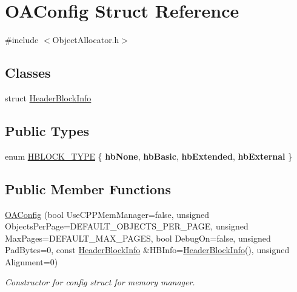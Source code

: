 \hypertarget{structOAConfig}{\section{O\-A\-Config Struct Reference}
\label{structOAConfig}
}


{\ttfamily \#include $<$Object\-Allocator.\-h$>$}

\subsection*{Classes}
\begin{DoxyCompactItemize}
\item 
struct \hyperlink{structOAConfig_1_1HeaderBlockInfo}{Header\-Block\-Info}
\end{DoxyCompactItemize}
\subsection*{Public Types}
\begin{DoxyCompactItemize}
\item 
enum \hyperlink{structOAConfig_a741c6dd161c0174180cc17f9a697b123}{H\-B\-L\-O\-C\-K\-\_\-\-T\-Y\-P\-E} \{ {\bfseries hb\-None}, 
{\bfseries hb\-Basic}, 
{\bfseries hb\-Extended}, 
{\bfseries hb\-External}
 \}
\end{DoxyCompactItemize}
\subsection*{Public Member Functions}
\begin{DoxyCompactItemize}
\item 
\hyperlink{structOAConfig_a036df6b3c5cefef38274637926155397}{O\-A\-Config} (bool Use\-C\-P\-P\-Mem\-Manager=false, unsigned Objects\-Per\-Page=D\-E\-F\-A\-U\-L\-T\-\_\-\-O\-B\-J\-E\-C\-T\-S\-\_\-\-P\-E\-R\-\_\-\-P\-A\-G\-E, unsigned Max\-Pages=D\-E\-F\-A\-U\-L\-T\-\_\-\-M\-A\-X\-\_\-\-P\-A\-G\-E\-S, bool Debug\-On=false, unsigned Pad\-Bytes=0, const \hyperlink{structOAConfig_1_1HeaderBlockInfo}{Header\-Block\-Info} \&H\-B\-Info=\hyperlink{structOAConfig_1_1HeaderBlockInfo}{Header\-Block\-Info}(), unsigned Alignment=0)
\begin{DoxyCompactList}\small\item\em Constructor for config struct for memory manager. \end{DoxyCompactList}\end{DoxyCompactItemize}
